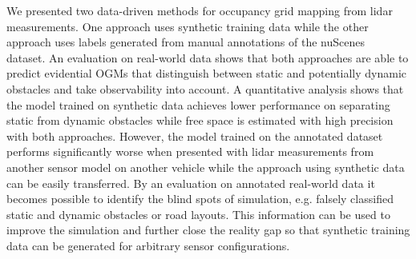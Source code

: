 \documentclass[conference]{IEEEtran}
\begin{document}
We presented two data-driven methods for occupancy grid mapping from lidar measurements. One approach uses synthetic training data while the other approach uses labels generated from manual annotations of the nuScenes~\cite{Caesar.2020} dataset. An evaluation on real-world data shows that both approaches are able to predict evidential OGMs that distinguish between static and potentially dynamic obstacles and take observability into account. A quantitative analysis shows that the model trained on synthetic data achieves lower performance on separating static from dynamic obstacles while free space is estimated with high precision with both approaches. However, the model trained on the annotated dataset performs significantly worse when presented with lidar measurements from another sensor model on another vehicle while the approach using synthetic data can be easily transferred. By an evaluation on annotated real-world data it becomes possible to identify the blind spots of simulation, e.g. falsely classified static and dynamic obstacles or road layouts. This information can be used to improve the simulation and further close the reality gap so that synthetic training data can be generated for arbitrary sensor configurations.





\vspace{12pt}
\end{document}

